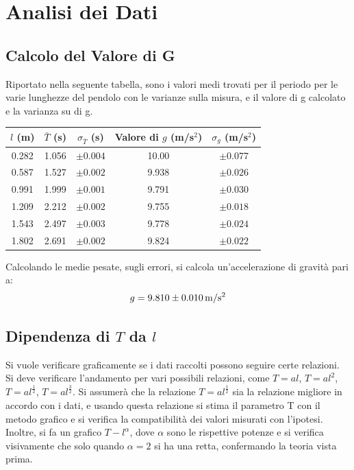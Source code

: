 \documentclass[a4paper]{article}
\begin{document}
\section{Analisi dei Dati}
\subsection{Calcolo del Valore di G}
Riportato nella seguente tabella, sono i valori medi trovati per il periodo per le varie lunghezze del pendolo con le varianze sulla misura, e il valore di g calcolato e la varianza su di g.

\begin{center}
    \begin{tabular}{|c|c|c|c|c|}
    \hline
    $l$ (m) & $\bar{T}$ (s)& $\sigma_{\bar{T}}$ (s) & Valore di $g$ (m/s$^2$)& $\sigma_g$  (m/s$^2$)\\
    \hline
      0.282 & 1.056 & $\pm{0.004}$& 10.00 & $\pm{0.077}$\\
      0.587 & 1.527 & $\pm{0.002}$& 9.938 & $\pm{0.026}$\\
      0.991 & 1.999 & $\pm{0.001}$& 9.791& $\pm{0.030}$\\
      1.209 & 2.212 & $\pm{0.002}$& 9.755 & $\pm{0.018}$\\
      1.543 & 2.497 & $\pm{0.003}$& 9.778 & $\pm{0.024}$\\
      1.802 & 2.691 & $\pm{0.002}$& 9.824 & $\pm{0.022}$\\
    \hline
    \end{tabular}
\end{center}

Calcolando le medie pesate, sugli errori, si calcola un'accelerazione di gravità pari a:
\begin{equation}
    g = 9.810 \SI{\pm0.010}{m/s^2}
\end{equation}

\subsection{Dipendenza di $T$ da $l$}
Si vuole verificare graficamente se i dati raccolti possono seguire certe relazioni. Si deve verificare l'andamento per vari possibili relazioni, come $T=al$, $T=al^2$, $T=al^\frac{1}{2}$, $T=al^\frac{3}{2}$. Si assumerà che la relazione $T=al^\frac{1}{2}$ sia la relazione migliore in accordo con i dati, e usando questa relazione si stima il parametro T con il metodo grafico e si verifica la compatibilità dei valori misurati con l'ipotesi. Inoltre, si fa un grafico $T-l^\alpha$, dove $\alpha$ sono le rispettive potenze e si verifica visivamente che solo quando $\alpha = 2$ si ha una retta, confermando la teoria vista prima.
\end{document}
